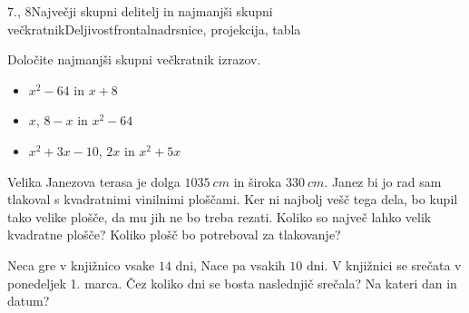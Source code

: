 \begin{priprava}{7., 8}{}{Največji skupni delitelj in najmanjši skupni večkratnik}{Deljivost}{frontalna}{drsnice, projekcija, tabla}
\begin{naloga}
    Določite najmanjši skupni večkratnik izrazov.
    \begin{itemize}
        \item $x^2-64$ in $x+8$ 
        \item $x$, $8-x$ in $x^2-64$ 
        \item $x^2+3x-10$, $2x$ in $x^2+5x$ 
    \end{itemize}
\end{naloga}

\begin{naloga}
    Velika Janezova terasa je dolga $1035~cm$ in široka $330~cm$. Janez bi jo rad sam tlakoval s kvadratnimi vinilnimi ploščami.
    Ker ni najbolj vešč tega dela, bo kupil tako velike plošče, da mu jih ne bo treba rezati.
    Koliko so največ lahko velik kvadratne plošče? Koliko plošč bo potreboval za tlakovanje? 
\end{naloga}

\begin{naloga}
    Neca gre v knjižnico vsake $14$ dni, Nace pa vsakih $10$ dni. V knjižnici se srečata v ponedeljek 1. marca.
    Čez koliko dni se bosta naslednjič srečala? Na kateri dan in datum?                     
\end{naloga}

        
            
 


\end{priprava}